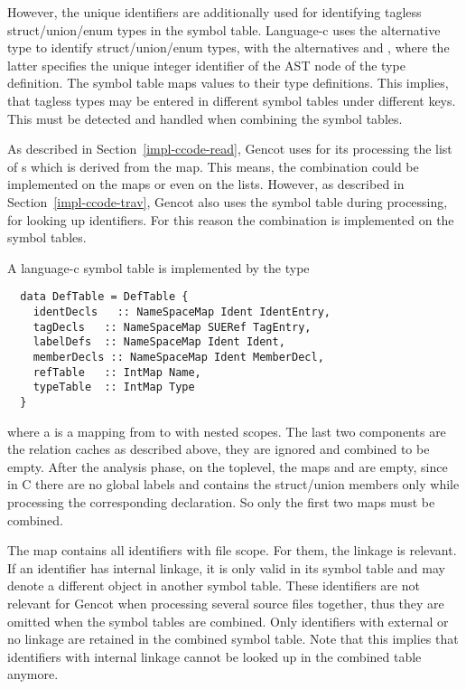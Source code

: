 However, the unique identifiers are additionally used for identifying tagless struct/union/enum types in the symbol table.
Language-c uses the alternative type  to identify struct/union/enum types, with the alternatives 
 and , where the latter specifies the unique integer identifier of the AST node
of the type definition. The symbol table maps  values to their type definitions. This implies, that
tagless types may be entered in different symbol tables under different keys. This must be detected and handled
when combining the symbol tables.

As described in Section~\ref{impl-ccode-read}, Gencot uses for its processing the list of s which is
derived from the  map. This means, the combination could be implemented on the 
maps or even on the  lists. However, as described in Section~\ref{impl-ccode-trav}, Gencot also
uses the symbol table during processing, for looking up identifiers. For this reason the combination is implemented
on the symbol tables.

A language-c symbol table is implemented by the type 
\begin{verbatim}
  data DefTable = DefTable {
    identDecls   :: NameSpaceMap Ident IdentEntry,
    tagDecls   :: NameSpaceMap SUERef TagEntry,
    labelDefs  :: NameSpaceMap Ident Ident,
    memberDecls :: NameSpaceMap Ident MemberDecl,
    refTable   :: IntMap Name,
    typeTable  :: IntMap Type
  }
\end{verbatim}
where a  is a mapping from  to  with nested scopes. The last two components are the 
relation caches as described above, they are ignored and combined to be empty. After the analysis phase, on the toplevel, 
the maps  and  are empty, since in C there are no global labels and 
contains the struct/union members only while processing the corresponding declaration. So only the first two maps must
be combined.

The map  contains all identifiers with file scope. For them, the linkage is relevant. If an identifier has 
internal linkage, it is only valid in its symbol table and may denote a different object in another symbol table. These
identifiers are not relevant for Gencot when processing several source files together, thus they are omitted when the
symbol tables are combined. Only identifiers with external or no linkage are retained in the combined symbol table. Note
that this implies that identifiers with internal linkage cannot be looked up in the combined table anymore.

